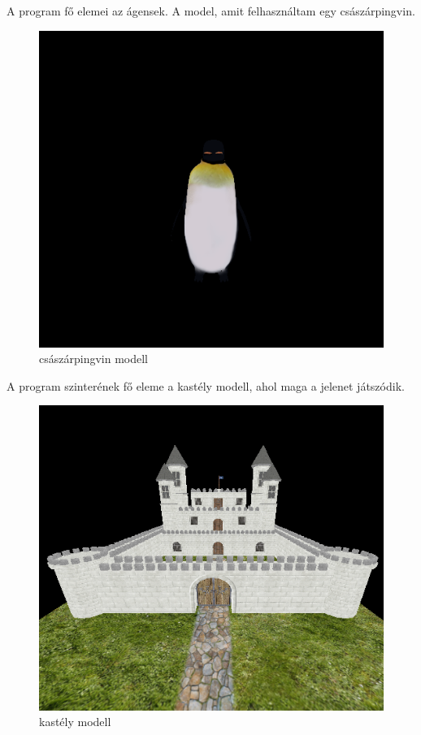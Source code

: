A program fő elemei az ágensek. A model, amit felhasználtam egy császárpingvin. 
\begin{figure}[htp]
    \centering
   	\includegraphics[width=4truecm, height=3truecm]{images/penguin.png}
	\caption{császárpingvin modell}
\end{figure}

A program szinterének fő eleme a kastély modell, ahol maga a jelenet játszódik.\\
\begin{figure}[htp]
    \centering
   	\includegraphics[width=4truecm, height=3truecm]{images/castle.png}
	\caption{kastély modell}
\end{figure}

